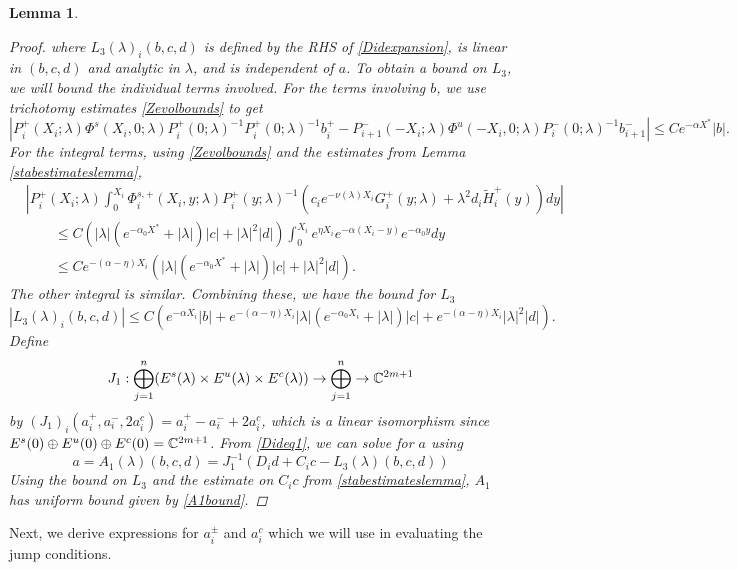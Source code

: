 \documentclass[10pt,reqno]{amsart}
\theoremstyle{plain}
\newtheorem{lemma}[theorem]{Lemma}
\theoremstyle{definition}
\theoremstyle{remark}
\numberwithin{theorem}{section}
\numberwithin{equation}{section}
\begin{document}
\begin{lemma}
\begin{proof}
where $L_3(\lambda)_i(b, c, d)$ is defined by the RHS of \cref{Didexpansion}, is linear in $(b,c,d)$ and analytic in $\lambda$, and is independent of $a$. To obtain a bound on $L_3$, we will bound the individual terms involved. For the terms involving $b$, we use trichotomy estimates \eqref{Zevolbounds} to get
\[
| P_i^+(X_i; \lambda)\Phi^s(X_i, 0; \lambda) P_i^+(0; \lambda)^{-1} P_i^+(0; \lambda)^{-1} b_i^+ - P_{i+1}^-(-X_i; \lambda) \Phi^u(-X_i, 0; \lambda) P_i^-(0; \lambda)^{-1} b_{i+1}^-| \leq C e^{-\alpha X^*} |b|.
\]
For the integral terms, using \eqref{Zevolbounds} and the estimates from Lemma \ref{stabestimateslemma},
\begin{align*}
&\left| P_i^+(X_i; \lambda) \int_0^{X_i} \Phi_i^{s,+}(X_i, y; \lambda)P_i^+(y; \lambda)^{-1} (c_i e^{-\nu(\lambda)X_i} G_i^+(y; \lambda) + \lambda^2 d_i \tilde{H}_i^+(y)) dy \right| \\
&\qquad \leq C \left( |\lambda|(e^{-\alpha_0 X^*}+ |\lambda|) |c| + |\lambda|^2 |d| \right) \int_0^{X_i} e^{\eta X_i} e^{-\alpha(X_i - y)} e^{-\alpha_0 y} dy \\
&\qquad \leq C e^{-(\alpha - \eta)X_i}\left( |\lambda|(e^{-\alpha_0 X^*}+ |\lambda|) |c| + |\lambda|^2 |d| \right).
\end{align*}
The other integral is similar. Combining these, we have the bound for $L_3$
\begin{equation}\label{L3bound}
|L_3(\lambda)_i(b, c, d)| \leq C \left( e^{-\alpha X_i} |b| + e^{-(\alpha - \eta)X_i} |\lambda| (e^{-\alpha_0 X_i } + |\lambda|) |c| + e^{-(\alpha - \eta)X_i} |\lambda|^2 |d| \right).
\end{equation}
Define
\[
J_1: \bigoplus_{j=1}^n (E^s(\lambda) \times E^u(
\lambda) \times E^c(\lambda) ) \rightarrow \bigoplus_{j=1}^n \rightarrow \mathbb{C}^{2m+1}
\]
by $(J_1)_i(a_i^+, a_i^-, 2 a_i^c) = a_i^+ - a_i^- + 2 a_i^c$, which is a linear isomorphism since $E^s(0) \oplus E^u(0) \oplus E^c(0) = \mathbb{C}^{2m+1}$. From \cref{Dideq1}, we can solve for $a$ using  
\[
a = A_1(\lambda)(b, c, d) = J_1^{-1} \left(D_i d + C_i c - L_3(\lambda)(b, c, d)\right)
\]
Using the bound on $L_3$ and the estimate on $C_i c$ from \cref{stabestimateslemma}, $A_1$ has uniform bound given by \cref{A1bound}.
\end{proof}
\end{lemma}

Next, we derive expressions for $a_i^\pm$ and $a_i^c$ which we will use in evaluating the jump conditions.
\end{document}
